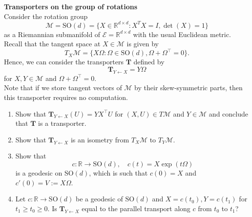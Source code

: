 \documentclass[en, oneside]{assignment}
\begin{document}
\begin{prob} \textbf{Transporters on the group of rotations}\\
    Consider the rotation group
    \begin{equation*}
        \mathcal{M} = \text{SO}(d) = \{ X \in \mathbb{R}^{d \times d} : X^T X = I, \det(X) = 1 \}
    \end{equation*}
    as a Riemannian submanifold of $\mathcal{E} = \mathbb{R}^{d \times d}$ with the usual Euclidean metric.\\
    Recall that the tangent space at $X \in \mathcal{M}$ is given by
    \begin{equation*}
        T_X \mathcal{M} = \{ X \Omega : \Omega \in \text{SO}(d), \Omega + \Omega^\top = 0\}.
    \end{equation*}
    Hence, we can consider the transporters $\mathbf{T}$ defined by
    \begin{equation*}
        \mathbf{T}_{Y \leftarrow X} = Y \Omega
    \end{equation*}
    for $X, Y \in \mathcal{M}$ and $\Omega + \Omega^\top = 0$.\\
    Note that if we store tangent vectors of $\mathcal{M}$ by their skew-symmetric parts, then this transporter requires no computation.
    \begin{enumerate}[label=(\arabic*)]
        \item Show that $\mathbf{T}_{Y \leftarrow X}(U) = Y X^\top U$ for $(X, U) \in T \mathcal{M}$ and $Y \in \mathcal{M}$ and conclude that $\mathbf{T}$ is a transporter.
        \item Show that $\mathbf{T}_{Y \leftarrow X}$ is an isometry from $T_X \mathcal{M}$ to $T_Y \mathcal{M}$.
        \item Show that
        \begin{equation*}
            c : \mathbb{R} \rightarrow \text{SO}(d), \quad c(t) = X \exp(t \Omega)
        \end{equation*}
        is a geodesic on $\text{SO}(d)$, which is such that $c(0) = X$ and $c'(0) = V := X \Omega$.
        \item Let $c : \mathbb{R} \rightarrow \text{SO}(d)$ be a geodesic of $\text{SO}(d)$ and $X = c(t_0), Y = c(t_1)$ for $t_1 \geq t_0 \geq 0$.
        Is $\mathbf{T}_{Y \leftarrow X}$ equal to the parallel transport along $c$ from $t_0$ to $t_1$?
    \end{enumerate}
\end{prob}
\end{document}
